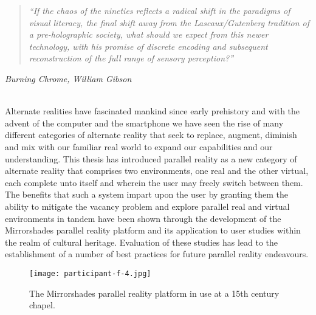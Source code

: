 


\begin{quote}
	\textit{``If the chaos of the nineties reflects a radical shift in the paradigms of visual literacy, the final shift away from the Lascaux/Gutenberg tradition of a pre-holographic society, what should we expect from this newer technology, with his promise of discrete encoding and subsequent reconstruction of the full range of sensory perception?''}
\end{quote}
\hfill \textit{Burning Chrome, William Gibson}
\\
\\


\label{chapter-conclusions}

Alternate realities have fascinated mankind since early prehistory and with the advent of the computer and the smartphone we have seen the rise of many different categories of alternate reality that seek to replace, augment, diminish and mix with our familiar real world to expand our capabilities and our understanding. This thesis has introduced parallel reality as a new category of alternate reality that comprises two environments, one real and the other virtual, each complete unto itself and wherein the user may freely switch between them. The benefits that such a system impart upon the user by granting them the ability to mitigate the vacancy problem and explore parallel real and virtual environments in tandem have been shown through the development of the Mirrorshades parallel reality platform and its application to user studies within the realm of cultural heritage. Evaluation of these studies has lead to the establishment of a number of best practices for future parallel reality endeavours.

\begin{figure}[t]
	\begin{center}
		\texttt{[image: participant-f-4.jpg]}
		\caption{The Mirrorshades parallel reality platform in use at a 15th century chapel.}
		\label{participant-f-4.jpg}
	\end{center}	
\end{figure}

